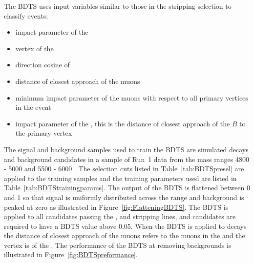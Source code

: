 The BDTS uses input variables similar to those in the stripping selection to classify events;
\begin{itemize}
\item impact parameter \chisqd of the \bsd
\item vertex \chisqd of the \bsd
\item direction cosine of \bsd
\item distance of closest approach of the muons
\item minimum impact parameter \chisqd of the muons with respect to all primary vertices in the event
\item impact parameter of the \bsd, this is the distance of closest approach of the $B$ to the primary vertex
\end{itemize}
The signal and background samples used to train the BDTS are simulated \bsmumu decays and background candidates in a sample of Run~1 data from the mass ranges 4800 - 5000 \mevcc and 5500 - 6000 \mevcc. The selection cuts listed in Table~\ref{tab:BDTSpresel} are applied to the training samples and the training parameters used are listed in Table~\ref{tab:BDTStrainingparams}. The output of the BDTS is flattened between 0 and 1 so that signal is uniformly distributed across the range and background is peaked at zero as illustrated in Figure~\ref{fig:FlatteningBDTS}. The BDTS is applied to all candidates passing the \bmumu, \bhh and \bujpsik stripping lines, and candidates are required to have a BDTS value above 0.05. When the BDTS is applied to \bujpsik decays the distance of closest approach of the muons refers to the muons in the \jpsi and the vertex \chisqd is of the \jpsi. %
The performance of the BDTS at removing backgrounds is illustrated in Figure~\ref{fig:BDTSpreformance}. %

